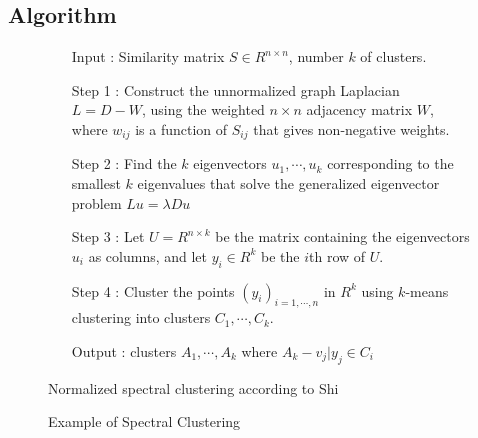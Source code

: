 \subsection{Algorithm}
\begin{figure}[ht]
\begin{mdframed}
\begin{enumerate}
\item[Input] : Similarity matrix $S \in R^{n \times n}$, number $k$ of clusters. \\
\item[Step 1] : Construct the unnormalized graph Laplacian $L = D - W$, using the weighted $n \times n$ adjacency matrix $W$, where $w_{ij}$ is a function of $S_{ij}$ that gives non-negative weights. \\
\item[Step 2] : Find the $k$ eigenvectors $u_1, \cdots, u_k$ corresponding to the smallest $k$ eigenvalues that solve the generalized eigenvector problem $L u = \lambda D u$ \\
\item[Step 3] : Let $U = R^{n \times k}$ be the matrix containing the eigenvectors $u_i$ as columns, and let $y_i \in R^k$ be the $i$th row of $U$.\\
\item[Step 4] : Cluster the points $(y_i)_{i=1,\cdots,n}$ in $R^k$ using $k$-means clustering into clusters $C_1,\cdots,C_k$.\\
\item[Output] : clusters $A_1, \cdots, A_k$ where $A_k - {v_j|y_j \in C_i}$
\end{enumerate}
\end{mdframed}
\caption{Normalized spectral clustering according to Shi}
\end{figure}

\begin{figure}[htb2]
\begin{center}
\end{center}
\caption{Example of Spectral Clustering}
\label{fig:refSingleRobot1}
\end{figure}


